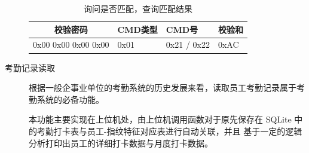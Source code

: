\begin{description}
        \begin{table}[H]
            \centering
            \caption{询问是否匹配，查询匹配结果} \label{询问是否匹配}
            \begin{tabular}{llll}
            \hline
            \multicolumn{1}{c}{校验密码} & CMD类型 & CMD号    & 校验和  \\ \hline
            0x00 0x00 0x00 0x00        & 0x01  & 0x21 / 0x22 & 0xAC \\ \hline
            \end{tabular}
        \end{table}

        \begin{table}[H]
            \caption{匹配应答包格式} \label{匹配应答包}
        \end{table}

        \item[考勤记录读取] 根据一般企事业单位的考勤系统的历史发展来看，读取员工考勤记录属于考勤系统的必备功能。
        
        本功能主要实现在上位机处，由上位机调用函数对于原先保存在 SQLite 中的考勤打卡表与员工-指纹特征对应表进行自动关联，并且
        基于一定的逻辑分析打印出员工的详细打卡数据与月度打卡数据。
        \newpage
    \end{description}
      

